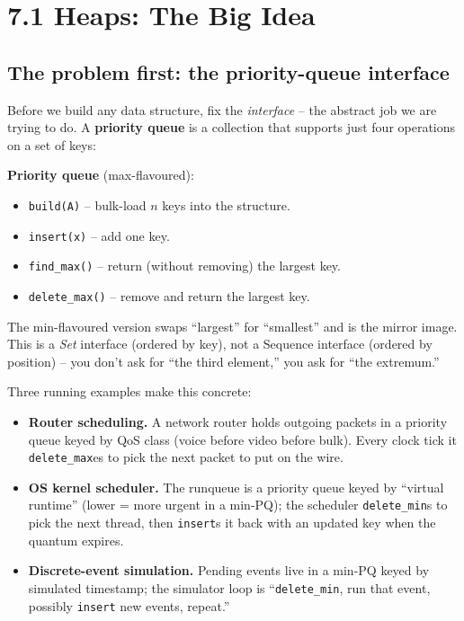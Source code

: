 \documentclass[11pt]{article}
\begin{document}
\section{7.1 Heaps: The Big Idea}

\subsection*{The problem first: the priority-queue interface}

Before we build any data structure, fix the \emph{interface} -- the
abstract job we are trying to do. A \textbf{priority queue} is a
collection that supports just four operations on a set of keys:

\begin{defnbox}
\textbf{Priority queue} (max-flavoured):
\begin{itemize}[leftmargin=*]
    \item \texttt{build(A)} -- bulk-load $n$ keys into the structure.
    \item \texttt{insert(x)} -- add one key.
    \item \texttt{find\_max()} -- return (without removing) the largest
          key.
    \item \texttt{delete\_max()} -- remove and return the largest key.
\end{itemize}
The min-flavoured version swaps ``largest'' for ``smallest'' and is the
mirror image. This is a \emph{Set} interface (ordered by key), not a
Sequence interface (ordered by position) -- you don't ask for ``the
third element,'' you ask for ``the extremum.''
\end{defnbox}

Three running examples make this concrete:

\begin{itemize}[leftmargin=*]
    \item \textbf{Router scheduling.} A network router holds outgoing
          packets in a priority queue keyed by QoS class (voice
          before video before bulk). Every clock tick it
          \texttt{delete\_max}es to pick the next packet to put on the
          wire.
    \item \textbf{OS kernel scheduler.} The runqueue is a priority
          queue keyed by ``virtual runtime'' (lower = more urgent in
          a min-PQ); the scheduler \texttt{delete\_min}s to pick the
          next thread, then \texttt{insert}s it back with an updated
          key when the quantum expires.
    \item \textbf{Discrete-event simulation.} Pending events live in a
          min-PQ keyed by simulated timestamp; the simulator loop is
          ``\texttt{delete\_min}, run that event, possibly
          \texttt{insert} new events, repeat.''
\end{itemize}
\end{document}
